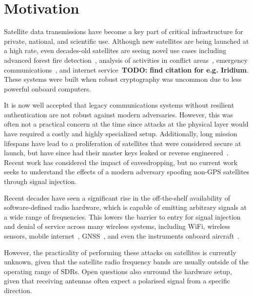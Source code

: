 \section{Motivation}

Satellite data transmissions have become a key part of critical infrastructure for private, national, and scientific use.
Although new satellites are being launched at a high rate, even decades-old satellites are seeing novel use cases including advanced forest fire detection~\cite{nasaFirms}, analysis of activities in conflict areas~\cite{separatistLuminosity}, emergency communications~\cite{apple_emergency_sos}, and internet service~\textbf{TODO: find citation for e.g. Iridium}.
These systems were built when robust cryptography was uncommon due to less powerful onboard computers.

It is now well accepted that legacy communications systems without resilient authentication are not robust against modern adversaries.
However, this was often not a practical concern at the time since attacks at the physical layer would have required a costly and highly specialized setup.
Additionally, long mission lifespans have lead to a proliferation of satellites that were considered secure at launch, but have since had their master keys leaked or reverse engineered~\cite{lrit-key-dec,xrit-rx}.
Recent work has considered the impact of eavesdropping, but no current work seeks to understand the effects of a modern adversary spoofing non-GPS satellites through signal injection.

Recent decades have seen a significant rise in the off-the-shelf availability of software-defined radio hardware, which is capable of emitting arbitrary signals at a wide range of frequencies.
This lowers the barrier to entry for signal injection and denial of service across many wireless systems, including WiFi, wireless sensors, mobile internet~\cite{yang2019hiding,erni2021adaptover}, GNSS~\cite{tippenhauer2011requirements}, and even the instruments onboard aircraft~\cite{sathayeWireless2019}.


However, the practicality of performing these attacks on satellites is currently unknown, given that the satellite radio frequency bands are usually outside of the operating range of SDRs.
Open questions also surround the hardware setup, given that receiving antennas often expect a polarised signal from a specific direction.

